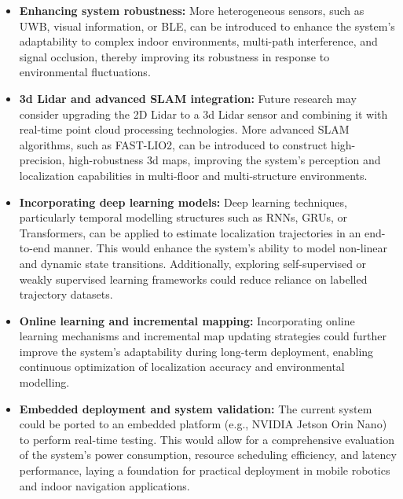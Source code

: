 \documentclass[12pt,a4paper]{article}
\numberwithin{equation}{section}
\begin{document}
\begin{itemize}
    \item \textbf{Enhancing system robustness:} More heterogeneous sensors, such as UWB, visual information, or BLE, can be introduced to enhance the system's adaptability to complex indoor environments, multi-path interference, and signal occlusion, thereby improving its robustness in response to environmental fluctuations.
    
    \item \textbf{3d Lidar and advanced SLAM integration:} Future research may consider upgrading the 2D Lidar to a 3d Lidar sensor and combining it with real-time point cloud processing technologies. More advanced SLAM algorithms, such as FAST-LIO2, can be introduced to construct high-precision, high-robustness 3d maps, improving the system's perception and localization capabilities in multi-floor and multi-structure environments.
    
    \item \textbf{Incorporating deep learning models:} Deep learning techniques, particularly temporal modelling structures such as RNNs, GRUs, or Transformers, can be applied to estimate localization trajectories in an end-to-end manner. This would enhance the system's ability to model non-linear and dynamic state transitions. Additionally, exploring self-supervised or weakly supervised learning frameworks could reduce reliance on labelled trajectory datasets.
    
    \item \textbf{Online learning and incremental mapping:} Incorporating online learning mechanisms and incremental map updating strategies could further improve the system's adaptability during long-term deployment, enabling continuous optimization of localization accuracy and environmental modelling.
    
    \item \textbf{Embedded deployment and system validation:} The current system could be ported to an embedded platform (e.g., NVIDIA Jetson Orin Nano) to perform real-time testing. This would allow for a comprehensive evaluation of the system's power consumption, resource scheduling efficiency, and latency performance, laying a foundation for practical deployment in mobile robotics and indoor navigation applications.
\end{itemize}











\newpage
\appendix 
\end{document}
